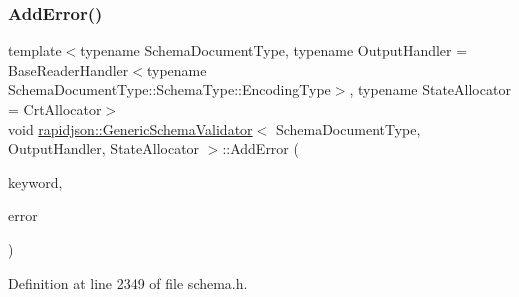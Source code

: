 \subsubsection{\texorpdfstring{AddError()}{AddError()}}
{\footnotesize\ttfamily template$<$typename Schema\+Document\+Type, typename Output\+Handler = Base\+Reader\+Handler$<$typename Schema\+Document\+Type\+::\+Schema\+Type\+::\+Encoding\+Type$>$, typename State\+Allocator = Crt\+Allocator$>$ \\
void \mbox{\hyperlink{classrapidjson_1_1_generic_schema_validator}{rapidjson\+::\+Generic\+Schema\+Validator}}$<$ Schema\+Document\+Type, Output\+Handler, State\+Allocator $>$\+::Add\+Error (\begin{DoxyParamCaption}\item[{\mbox{\hyperlink{classrapidjson_1_1_generic_schema_validator_a14216aea798d69f102987c1aae36e897}{Value\+Type}} \&}]{keyword,  }\item[{\mbox{\hyperlink{classrapidjson_1_1_generic_schema_validator_a14216aea798d69f102987c1aae36e897}{Value\+Type}} \&}]{error }\end{DoxyParamCaption})\hspace{0.3cm}{\ttfamily [private]}}



Definition at line 2349 of file schema.\+h.


